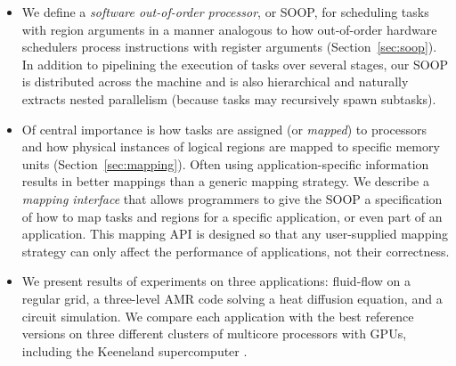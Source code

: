 \documentclass[conference]{IEEEtran}
\begin{document}

 
\begin{itemize}

\item We define a {\em software out-of-order processor}, or SOOP, for
  scheduling tasks with region arguments in a manner analogous to how
  out-of-order hardware schedulers process instructions with register
  arguments (Section~\ref{sec:soop}).  In addition to pipelining the execution of tasks over
  several stages, our SOOP is distributed across the machine and is
  also hierarchical and naturally extracts nested
  parallelism (because tasks may recursively spawn subtasks).



\item Of central importance is how
tasks are assigned (or {\em mapped}) to processors and how physical instances of logical regions are
mapped to specific memory units (Section~\ref{sec:mapping}).  Often using
application-specific information results in better
mappings than a generic mapping strategy.  We describe
a {\em mapping interface} that allows programmers to give the SOOP a specification
of how to map tasks and regions for a specific application, or even part of an
application.  This mapping API is designed so that
any user-supplied mapping strategy can only affect the performance of applications,
not their correctness.  


\item We present results of experiments on three applications:
  fluid-flow on a regular grid, a three-level AMR code solving a
  heat diffusion equation, and a circuit simulation.
  We compare each application with the best reference
  versions on three different clusters of multicore processors with
  GPUs, including the Keeneland supercomputer \cite{Keeneland}.
%
%

\end{itemize}
\end{document}
